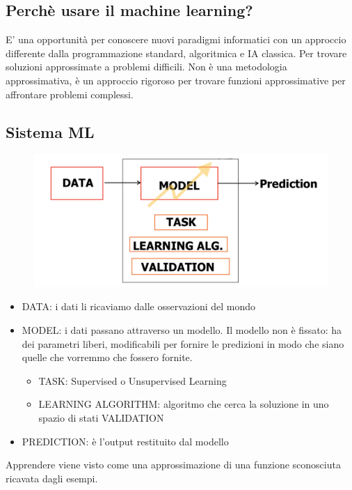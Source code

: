 \documentclass{article}
\begin{document}
\subsection{Perchè usare il machine learning?}
E' una opportunità per conoscere nuovi paradigmi informatici con un approccio differente dalla programmazione standard, algoritmica e IA classica. Per trovare soluzioni approssimate a problemi difficili. Non è una metodologia approssimativa, è un approccio rigoroso per trovare funzioni approssimative per affrontare problemi complessi. 

\subsection{Sistema ML}
\begin{figure}[H]
    \centering
    \includegraphics[scale=0.5]{Images/modelloML.png}
\end{figure}

\begin{itemize}
    \item DATA: i dati li ricaviamo dalle osservazioni del mondo
    \item MODEL: i dati passano attraverso un modello. Il modello non è fissato: ha dei parametri liberi, modificabili per fornire le predizioni in modo che siano quelle che vorremmo che fossero fornite.
    \begin{itemize}
        \item TASK: Supervised o Unsupervised Learning
        \item LEARNING ALGORITHM: algoritmo che cerca la soluzione in uno spazio di stati
        \ITEM VALIDATION
    \end{itemize}
    \item PREDICTION: è l'output restituito dal modello
\end{itemize} 
Apprendere viene visto come una approssimazione di una funzione sconosciuta ricavata dagli esempi. 
\end{document}
